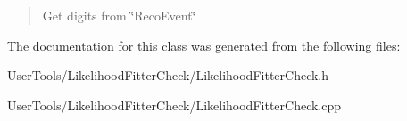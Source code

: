 \begin{quotation}
Get digits from \char`\"{}\-Reco\-Event\char`\"{} \end{quotation}


The documentation for this class was generated from the following files\-:\begin{DoxyCompactItemize}
\item 
User\-Tools/\-Likelihood\-Fitter\-Check/Likelihood\-Fitter\-Check.\-h\item 
User\-Tools/\-Likelihood\-Fitter\-Check/Likelihood\-Fitter\-Check.\-cpp\end{DoxyCompactItemize}
